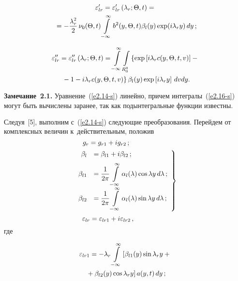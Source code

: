\begin{multicols}{2}
   \pagebreak
   
\noindent
  \begin{multline*}
  \varepsilon_{lr}' = \varepsilon_{lr}'\left(\lambda_r;\Theta, t\right)={}\\
  {}=
  -\displaystyle\frac{\displaystyle  \lambda_r^2\mathstrut}{\displaystyle 2\mathstrut}\,\nu_0 (\Theta,t)  \int\limits_{-\infty}^\infty b^2(y, \Theta, t) \beta_l (y) 
  \exp(i\lambda_r y) \,dy\,;
 \end{multline*}
 
 \vspace*{-12pt}
 
 \noindent
\begin{multline}
  \varepsilon_{lr}'' = \varepsilon_{lr}''\left(\lambda_r;\Theta, t\right)=
  \int\limits_{-\infty}^\infty \int\limits_{R_0^q} \left\{ \exp \left[ i\lambda_r  c (y,\Theta, t,v)\right]-{}\right.\\
\left.  {}-1-
  i\lambda_r c (y,\Theta, t,v)\right\} \beta_l (y) \exp\left[ i\lambda_r y\right]\,
   dvdy.\label{e2.16-s}
   \end{multline}


\noindent
\textbf{Замечание~2.1.}
Уравнение~(\ref{e2.14-s}) линейно, причем интегралы~(\ref{e2.16-s}) 
могут быть вычислены заранее, так как подынтегральные функции известны.

\smallskip

Следуя~[5], выполним с~(\ref{e2.14-s}) следующие преобразования. 
Перейдем от комплексных величин к~действительным, положив
\begin{equation}
\hspace*{-20.5mm}g_r = g_{r1} + i g_{r2}\,;\label{e2.17-s}
\end{equation}
\begin{equation}
\left.
\begin{array}{rl}
 \beta_l &= \beta_{l1} + i\beta_{l2}\,;\\[6pt]
    \beta_{l1}&=\displaystyle \displaystyle\frac{\displaystyle 1\mathstrut}{\displaystyle 2\pi\mathstrut} \int\limits_{-\infty}^\infty \alpha_l (\lambda) 
    \cos \lambda y \,d\lambda\,;\\[6pt]
    \beta_{l2}&= \displaystyle
    \displaystyle\frac{\displaystyle 1\mathstrut}{\displaystyle 2\pi\mathstrut} \int\limits_{-\infty}^\infty \alpha_l (\lambda) \sin \lambda y \,d\lambda\,;
    \end{array}
    \right\}
    \label{e2.18-s}
    \end{equation}
    \begin{equation*}
\hspace*{-18.5mm}\varepsilon_{lr} = \varepsilon_{lr1} + i \varepsilon_{lr2}\,,
\end{equation*}
где

\noindent
\begin{multline*}
\varepsilon_{lr1} =-\lambda_r\int\limits_{-\infty}^\infty \left[ \beta_{l1} (y) \sin \lambda_r y +{}\right.\\
\left.{}+ \beta_{l2} (y) 
\cos \lambda_r y\right] a (y, t) \,dy\,;
\end{multline*}


\end{multicols}
